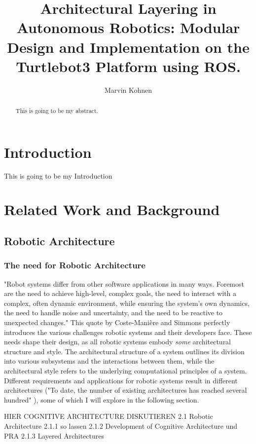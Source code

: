 \documentclass[]{article}
\title{Architectural Layering in Autonomous Robotics: Modular Design and Implementation on the Turtlebot3 Platform using ROS. }
\author{Marvin Kohnen}
\begin{document}
	\onehalfspacing
	\maketitle
	
	\newpage
	
	\begin{abstract}
		This is going to be my abstract.
	\end{abstract}
	
	\section{Introduction}
	This is going to be my Introduction
	\section{Related Work and Background}
	\subsection{Robotic Architecture}
	\subsubsection{The need for Robotic Architecture}
	"Robot systems differ from other software applications in many ways. Foremost are the need to achieve high-level, complex goals, the need to interact with a complex, often dynamic environment, while ensuring the system’s own dynamics, the need to handle noise and uncertainty, and the need to be reactive to unexpected changes." \autocite{coste-maniereArchitectureBackboneRobotic2000} This quote by Coste-Mani\`{e}re and Simmons perfectly introduces the various challenges robotic systems and their developers face. These needs shape their design, as all robotic systems embody \textit{some} architectural structure and style. The architectural structure of a system outlines its division into various subsystems and the interactions between them, while the architectural style refers to the underlying computational principles of a system. \autocite{coste-maniereArchitectureBackboneRobotic2000} Different requirements and applications for robotic systems result in different architectures ("To date, the number of existing architectures has reached several hundred" \autocite{kotseruba40YearsCognitive2020}), some of which I will explore in the following section.
	
	HIER COGNITIVE ARCHITECTURE DISKUTIEREN
	2.1 Robotic Architecture
	2.1.1 so lassen
	2.1.2 Development of Cognitive Architecture und PRA
	2.1.3 Layered Architectures
	
\end{document}
